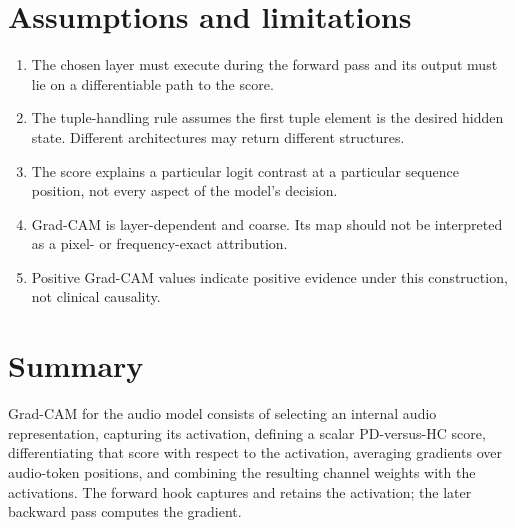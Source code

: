 \documentclass[11pt,a4paper]{article}
\begin{document}
\section{Assumptions and limitations}
\begin{enumerate}
\item The chosen layer must execute during the forward pass and its output must lie on a differentiable path to the score.
\item The tuple-handling rule assumes the first tuple element is the desired hidden state. Different architectures may return different structures.
\item The score explains a particular logit contrast at a particular sequence position, not every aspect of the model's decision.
\item Grad-CAM is layer-dependent and coarse. Its map should not be interpreted as a pixel- or frequency-exact attribution.
\item Positive Grad-CAM values indicate positive evidence under this construction, not clinical causality.
\end{enumerate}

\section{Summary}
Grad-CAM for the audio model consists of selecting an internal audio representation, capturing its activation, defining a scalar PD-versus-HC score, differentiating that score with respect to the activation, averaging gradients over audio-token positions, and combining the resulting channel weights with the activations. The forward hook captures and retains the activation; the later backward pass computes the gradient.
\end{document}
